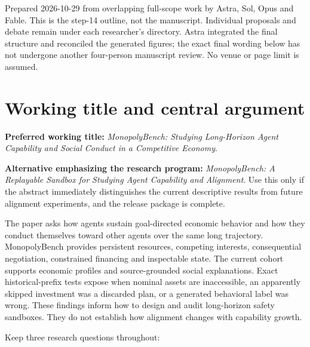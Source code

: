 Prepared 2026-10-29 from overlapping full-scope work by Astra, Sol, Opus and Fable. This is the step-14 outline, not the manuscript. Individual proposals and debate remain under each researcher's directory. Astra integrated the final structure and reconciled the generated figures; the exact final wording below has not undergone another four-person manuscript review. No venue or page limit is assumed.

\section*{Working title and central argument}
\textbf{Preferred working title:} \emph{MonopolyBench: Studying Long-Horizon Agent Capability and Social Conduct in a Competitive Economy}.

\textbf{Alternative emphasizing the research program:} \emph{MonopolyBench: A Replayable Sandbox for Studying Agent Capability and Alignment}. Use this only if the abstract immediately distinguishes the current descriptive results from future alignment experiments, and the release package is complete.

The paper asks how agents sustain goal-directed economic behavior and how they conduct themselves toward other agents over the same long trajectory. MonopolyBench provides persistent resources, competing interests, consequential negotiation, constrained financing and inspectable state. The current cohort supports economic profiles and source-grounded social explanations. Exact historical-prefix tests expose when nominal assets are inaccessible, an apparently skipped investment was a discarded plan, or a generated behavioral label was wrong. These findings inform how to design and audit long-horizon safety sandboxes. They do not establish how alignment changes with capability growth.

Keep three research questions throughout:


